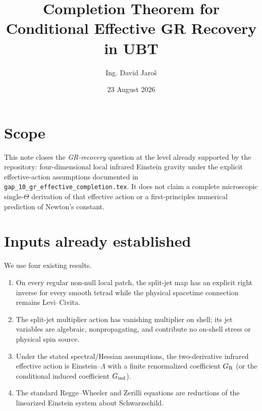 \documentclass[11pt,a4paper]{article}
\title{Completion Theorem for Conditional Effective GR Recovery in UBT}
\author{Ing. David Jaro\v{s}}
\date{23 August 2026}
\begin{document}
\maketitle
\UBTProvenanceNotice

\section{Scope}
This note closes the \emph{GR-recovery} question at the level already supported
by the repository: four-dimensional local infrared Einstein gravity under the
explicit effective-action assumptions documented in
\texttt{gap\_10\_gr\_effective\_completion.tex}.  It does not claim a complete
microscopic single-$\Theta$ derivation of that effective action or a
first-principles numerical prediction of Newton's constant.

\section{Inputs already established}
We use four existing results.
\begin{enumerate}
\item On every regular non-null local patch, the split-jet map has an explicit
right inverse for every smooth tetrad while the physical spacetime connection
remains Levi--Civita.
\item The split-jet multiplier action has vanishing multiplier on shell; its
jet variables are algebraic, nonpropagating, and contribute no on-shell stress
or physical spin source.
\item Under the stated spectral/Hessian assumptions, the two-derivative
infrared effective action is Einstein--$\Lambda$ with a finite renormalized
coefficient $G_{\rm R}$ (or the conditional induced coefficient
$G_{\rm ind}$).
\item The standard Regge--Wheeler and Zerilli equations are reductions of the
linearized Einstein system about Schwarzschild.
\end{enumerate}

\end{document}
